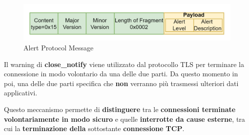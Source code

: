 \begin{figure}[h]
    \centering
    \includegraphics{image/tlsalert.png}
    \caption{Alert Protocol Message}
    \label{fig:tlsalert}
\end{figure}
\begin{note}
Il warning di \textbf{close\_notify} viene utilizzato dal protocollo TLS per terminare la connessione in modo volontario da una delle due parti. Da questo momento in poi, una delle due parti specifica che \textbf{non} verranno più trasmessi ulteriori dati applicativi.
\end{note}
Questo meccanismo permette di \textbf{distinguere} tra le \textbf{connessioni terminate volontariamente in modo sicuro}  e quelle \textbf{interrotte da cause esterne}, tra cui la \textbf{terminazione della} sottostante \textbf{connessione TCP}.
